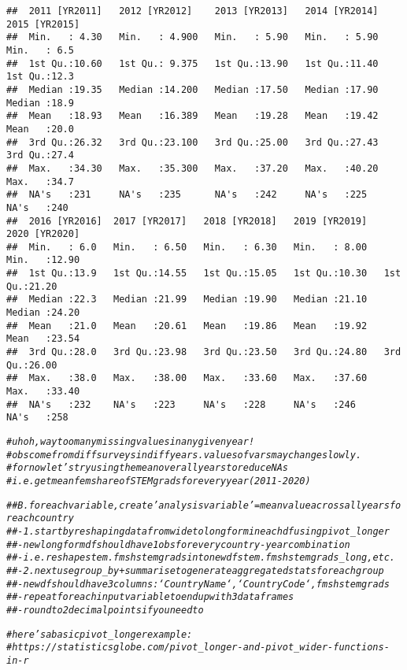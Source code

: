 \documentclass{article}\usepackage[]{graphicx}\usepackage[]{xcolor}
\makeatletter
\newcommand{\hlcom}[1]{\textcolor[rgb]{0.678,0.584,0.686}{\textit{#1}}}%
\newenvironment{kframe}{%
 \def\at@end@of@kframe{}%
 \ifinner\ifhmode%
  \def\at@end@of@kframe{\end{minipage}}%
  \begin{minipage}{\columnwidth}%
 \fi\fi%
 \def\FrameCommand##1{\hskip\@totalleftmargin \hskip-\fboxsep
 \colorbox{shadecolor}{##1}\hskip-\fboxsep
     \hskip-\linewidth \hskip-\@totalleftmargin \hskip\columnwidth}%
 \MakeFramed {\advance\hsize-\width
   \@totalleftmargin\z@ \linewidth\hsize
   \@setminipage}}%
 {\par\unskip\endMakeFramed%
 \at@end@of@kframe}
\newenvironment{knitrout}{}{} %
\makeatother
\begin{document}
\begin{knitrout}
\begin{kframe}
\begin{verbatim}
##  2011 [YR2011]   2012 [YR2012]    2013 [YR2013]   2014 [YR2014]   2015 [YR2015] 
##  Min.   : 4.30   Min.   : 4.900   Min.   : 5.90   Min.   : 5.90   Min.   : 6.5  
##  1st Qu.:10.60   1st Qu.: 9.375   1st Qu.:13.90   1st Qu.:11.40   1st Qu.:12.3  
##  Median :19.35   Median :14.200   Median :17.50   Median :17.90   Median :18.9  
##  Mean   :18.93   Mean   :16.389   Mean   :19.28   Mean   :19.42   Mean   :20.0  
##  3rd Qu.:26.32   3rd Qu.:23.100   3rd Qu.:25.00   3rd Qu.:27.43   3rd Qu.:27.4  
##  Max.   :34.30   Max.   :35.300   Max.   :37.20   Max.   :40.20   Max.   :34.7  
##  NA's   :231     NA's   :235      NA's   :242     NA's   :225     NA's   :240   
##  2016 [YR2016]  2017 [YR2017]   2018 [YR2018]   2019 [YR2019]   2020 [YR2020]  
##  Min.   : 6.0   Min.   : 6.50   Min.   : 6.30   Min.   : 8.00   Min.   :12.90  
##  1st Qu.:13.9   1st Qu.:14.55   1st Qu.:15.05   1st Qu.:10.30   1st Qu.:21.20  
##  Median :22.3   Median :21.99   Median :19.90   Median :21.10   Median :24.20  
##  Mean   :21.0   Mean   :20.61   Mean   :19.86   Mean   :19.92   Mean   :23.54  
##  3rd Qu.:28.0   3rd Qu.:23.98   3rd Qu.:23.50   3rd Qu.:24.80   3rd Qu.:26.00  
##  Max.   :38.0   Max.   :38.00   Max.   :33.60   Max.   :37.60   Max.   :33.40  
##  NA's   :232    NA's   :223     NA's   :228     NA's   :246     NA's   :258
\end{verbatim}
\begin{alltt}
    \hlcom{# uh oh, way too many missing values in any given year!}
    \hlcom{# obs come from diff surveys in diff years. values of vars may change slowly.}
    \hlcom{# for now let's try using the mean over all years to reduce NAs}
      \hlcom{# i.e. get mean fem share of STEM grads for every year (2011-2020)}


\hlcom{## B. for each variable, create 'analysis variable' = mean value across all years for each country}
\hlcom{##  - 1. start by reshaping data from wide to long form in each df using pivot_longer}
\hlcom{##    - new long form df should have 1 obs for every country-year combination}
\hlcom{##    - i.e. reshape stem.fmshstemgrads into new df stem.fmshstemgrads_long, etc.}
\hlcom{##  - 2. next use group_by + summarise to generate aggregated stats for each group}
\hlcom{##    - new df should have 3 columns: `Country Name`, `Country Code`, fmshstemgrads}
\hlcom{##    - repeat for each input variable to end up with 3 data frames}
\hlcom{##    - round to 2 decimal points if you need to}

  \hlcom{# here's a basic pivot_longer example: }
    \hlcom{# https://statisticsglobe.com/pivot_longer-and-pivot_wider-functions-in-r}


\end{alltt}
\end{kframe}
\end{knitrout}
\end{document}
